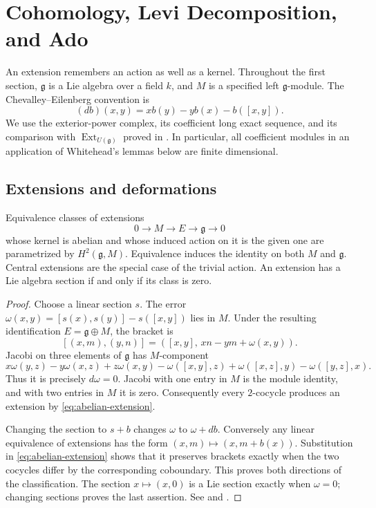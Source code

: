 \chapter{Cohomology, Levi Decomposition, and Ado}
\label{ch:cohomology-levi-ado}

An extension remembers an action as well as a kernel. Throughout the first
section, \(\mathfrak g\) is a Lie algebra over a field \(k\), and \(M\) is
a specified left \(\mathfrak g\)-module. The Chevalley--Eilenberg convention is
\[
 (db)(x,y)=x b(y)-y b(x)-b([x,y]).
\]
We use the exterior-power complex, its coefficient long exact sequence,
and its comparison with \(\operatorname{Ext}_{U(\mathfrak g)}\) proved in
\cite[Chapter 6, A06--A08]{homological}. In particular, all coefficient
modules in an application of Whitehead's lemmas below are finite dimensional.

\section{Extensions and deformations}

\begin{theorem}\label{res:I01}
Equivalence classes of extensions
\[
 0\longrightarrow M\longrightarrow E\longrightarrow\mathfrak g
 \longrightarrow0
\]
whose kernel is abelian and whose induced action on it is the given one
are parametrized by \(H^2(\mathfrak g,M)\). Equivalence induces the identity
on both \(M\) and \(\mathfrak g\). Central extensions are the special case
of the trivial action. An extension has a Lie algebra section if and only
if its class is zero.
\end{theorem}
\begin{proof}
Choose a linear section \(s\). The error
\(\omega(x,y)=[s(x),s(y)]-s([x,y])\) lies in \(M\).
Under the resulting identification \(E=\mathfrak g\oplus M\), the bracket is
\[
 [(x,m),(y,n)]=([x,y],\,xn-ym+\omega(x,y)).
 \tag{9.1}\label{eq:abelian-extension}
\]
Jacobi on three elements of \(\mathfrak g\) has \(M\)-component
\[
 x\omega(y,z)-y\omega(x,z)+z\omega(x,y)
 -\omega([x,y],z)+\omega([x,z],y)-\omega([y,z],x).
\]
Thus it is precisely \(d\omega=0\). Jacobi with one entry in \(M\)
is the module identity, and with two entries in \(M\) it is zero.
Consequently every \(2\)-cocycle produces an extension by
\eqref{eq:abelian-extension}.

Changing the section to \(s+b\) changes \(\omega\) to \(\omega+db\).
Conversely any linear equivalence of extensions has the form
\((x,m)\mapsto(x,m+b(x))\). Substitution in \eqref{eq:abelian-extension}
shows that it preserves brackets exactly when the two cocycles differ
by the corresponding coboundary. This proves both directions of the
classification. The section \(x\mapsto(x,0)\) is a Lie section exactly
when \(\omega=0\); changing sections proves the last assertion.
See \cite[Section 7.6]{weibel} and \cite[Proposition 48.3]{etingof}.
\end{proof}

